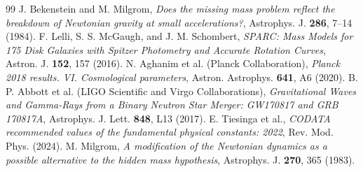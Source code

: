 \documentclass[11pt,a4paper]{article}
\theoremstyle{plain}
\theoremstyle{definition}
\theoremstyle{remark}
\begin{document}
\newpage
\begin{thebibliography}{99}
 J. Bekenstein and M. Milgrom, \textit{Does the missing mass problem reflect the breakdown of Newtonian gravity at small accelerations?}, Astrophys. J. \textbf{286}, 7--14 (1984).
 F. Lelli, S. S. McGaugh, and J. M. Schombert, \textit{SPARC: Mass Models for 175 Disk Galaxies with Spitzer Photometry and Accurate Rotation Curves}, Astron. J. \textbf{152}, 157 (2016).
 N. Aghanim et al. (Planck Collaboration), \textit{Planck 2018 results. VI. Cosmological parameters}, Astron. Astrophys. \textbf{641}, A6 (2020).
 B. P. Abbott et al. (LIGO Scientific and Virgo Collaborations), \textit{Gravitational Waves and Gamma-Rays from a Binary Neutron Star Merger: GW170817 and GRB 170817A}, Astrophys. J. Lett. \textbf{848}, L13 (2017).
 E. Tiesinga et al., \textit{CODATA recommended values of the fundamental physical constants: 2022}, Rev. Mod. Phys. (2024).
 M. Milgrom, \textit{A modification of the Newtonian dynamics as a possible alternative to the hidden mass hypothesis}, Astrophys. J. \textbf{270}, 365 (1983).
\end{thebibliography}
\end{document}

